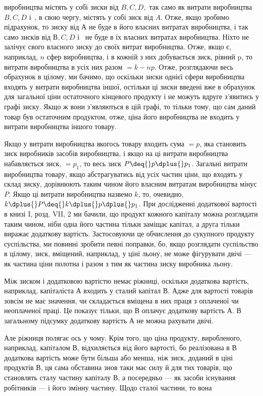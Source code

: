 \parcont{}  %
виробництва містять у собі зиски від $B, C, D,$ так само як витрати виробництва $B, C, D$ і~, в
свою чергу, містять у собі
зиск від $A$. Отже, якщо зробимо підрахунок, то зиску від $А$ не
буде в його власних витратах виробництва, і так само зисків
від $В, C, D$ і~ не буде в їх власних витратах виробництва.
Ніхто не залічує свого власного зиску до своїх витрат виробництва. Отже, якщо є, наприклад, $n$ сфер
виробництва, і в кожній з них добувається зиск, рівний p, то витрати виробництва в усіх них разом
$= k - np$. Отже, розглядаючи весь обрахунок
в цілому, ми бачимо, що оскільки зиски однієї сфери виробництва входять у витрати виробництва іншої,
остільки ці зиски
введені вже в обрахунок для загальної ціни остаточного кінцевого
продукту і не можуть вдруге з’явитись у графі зиску. Якщо ж
вони з’являються в цій графі, то тільки тому, що сам даний
товар був остаточним продуктом, отже, ціна його виробництва
не входить у витрати виробництва іншого товару.

Якщо у витрати виробництва якогось товару входить сума $= p$, яка становить зиск виробників засобів
виробництва, і якщо
на ці витрати виробництва набавляється зиск, $= p_1$, то весь зиск
$P \deq{} p \dplus{} p_1$. Загальні витрати виробництва товару, якщо абстрагуватись від усіх частин ціни, що
входять у склад зиску, дорівнюють таким чином його власним витратам виробництва мінус $P$.
Якщо ці витрати виробництва назвемо $k$, то, очевидно, $k \dplus{} P \deq{} k \dplus{} p \dplus{} p_1$. При дослідженні додаткової
вартості в книзі I,
розд. VII, 2 ми бачили, що продукт кожного капіталу можна розглядати таким чином, ніби
одна його частина
тільки заміщає капітал, а друга тільки виражає додаткову вартість. Застосовуючи це обчислення до
сукупного продукту
суспільства, ми повинні зробити певні поправки, бо, якщо
розглядати суспільство в цілому, зиск, вміщений, наприклад,
у ціні льону, не може фігурувати двічі — як частина ціни полотна
і разом з тим як частина зиску виробника льону.

Між зиском і додатковою вартістю немає ріжниці, оскільки
додаткова вартість, наприклад, капіталіста $А$ входить у сталий
капітал $В$. Адже для вартості товарів зовсім не має значення, чи
складається вміщена в них праця з оплаченої чи неоплаченої праці.
Це показує тільки, що $В$ оплачує додаткову вартість $А$. В загальному підсумку додаткову вартість $А$ не
можна рахувати двічі.

Але ріжниця полягає ось у чому. Крім того, що ціна продукту,
виробленого, наприклад, капіталом $В$, відхиляється від його вартості, бо реалізована в $В$ додаткова
вартість може бути більша
або менша, ніж зиск, доданий в ціні продуктів $В$, ця сама обставина
знов таки має силу й для тих товарів, що становлять сталу
частину капіталу $В$, а посередньо — як засоби існування робітників — і його змінну частину. Щодо
сталої частини, то вона
\parbreak{}  %
